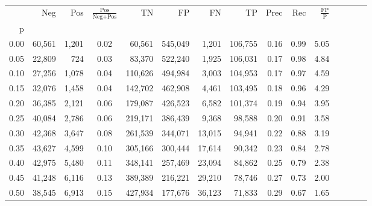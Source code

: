 \begin{tabular}{rrrcrrrrrrrrrrr}
\toprule
{} &     Neg &     Pos & $\frac{\text{Pos}}{\text{Neg}+\text{Pos}}$ &       TN &       FP &       FN &       TP &  Prec &   Rec & $\frac{\text{FP}}{\text{P}}$ \\
p    &         &         &                                            &          &          &          &          &       &       &                              \\
\midrule
0.00 &  60,561 &   1,201 &                                       0.02 &   60,561 &  545,049 &    1,201 &  106,755 &  0.16 &  0.99 &                         5.05 \\
0.05 &  22,809 &     724 &                                       0.03 &   83,370 &  522,240 &    1,925 &  106,031 &  0.17 &  0.98 &                         4.84 \\
0.10 &  27,256 &   1,078 &                                       0.04 &  110,626 &  494,984 &    3,003 &  104,953 &  0.17 &  0.97 &                         4.59 \\
0.15 &  32,076 &   1,458 &                                       0.04 &  142,702 &  462,908 &    4,461 &  103,495 &  0.18 &  0.96 &                         4.29 \\
0.20 &  36,385 &   2,121 &                                       0.06 &  179,087 &  426,523 &    6,582 &  101,374 &  0.19 &  0.94 &                         3.95 \\
0.25 &  40,084 &   2,786 &                                       0.06 &  219,171 &  386,439 &    9,368 &   98,588 &  0.20 &  0.91 &                         3.58 \\
0.30 &  42,368 &   3,647 &                                       0.08 &  261,539 &  344,071 &   13,015 &   94,941 &  0.22 &  0.88 &                         3.19 \\
0.35 &  43,627 &   4,599 &                                       0.10 &  305,166 &  300,444 &   17,614 &   90,342 &  0.23 &  0.84 &                         2.78 \\
0.40 &  42,975 &   5,480 &                                       0.11 &  348,141 &  257,469 &   23,094 &   84,862 &  0.25 &  0.79 &                         2.38 \\
0.45 &  41,248 &   6,116 &                                       0.13 &  389,389 &  216,221 &   29,210 &   78,746 &  0.27 &  0.73 &                         2.00 \\
0.50 &  38,545 &   6,913 &                                       0.15 &  427,934 &  177,676 &   36,123 &   71,833 &  0.29 &  0.67 &                         1.65 \\

\end{tabular}
